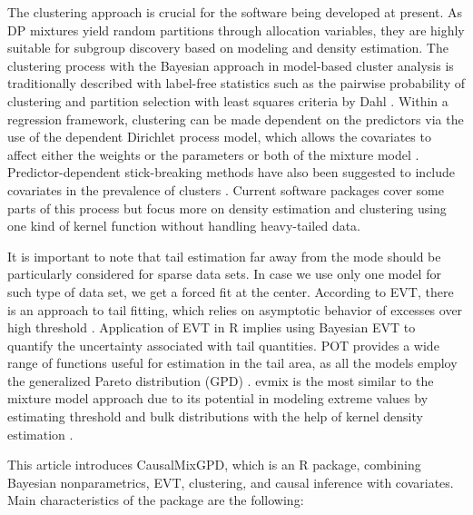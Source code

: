 \documentclass[preprint,12pt,authoryear]{elsarticle}
\newcommand{\pkg}[1]{\textsf{#1}}
\newcommand{\proglang}[1]{\textsf{#1}}
\begin{document}
The clustering approach is crucial for the software being developed at present.
As DP mixtures yield random partitions through allocation variables,
they are highly suitable for subgroup discovery based on modeling
and density estimation. The clustering process with the Bayesian
approach in model-based cluster analysis is traditionally described
with label-free statistics such as the pairwise probability of
clustering \citep{Binder1978} and partition selection with least
squares criteria by Dahl \citep{Dahl2006}. Within a regression
framework, clustering can be made dependent on the predictors via
the use of the dependent Dirichlet process model, which allows the
covariates to affect either the weights or the parameters or both
of the mixture model \citep{MacEachern1999, MacEachern2000, DeIorio2004, Quintana2022}.
Predictor-dependent stick-breaking methods have also been suggested
to include covariates in the prevalence of clusters
\citep{Ren2011}. Current software packages cover some parts of this
process but focus more on density estimation and clustering using
one kind of kernel function without handling heavy-tailed data.

It is important to note that tail estimation far away from the mode should be particularly considered for sparse data sets. In case we use only one model for such type of data set, we get a forced fit at the center. According to EVT, there is an approach to tail fitting, which relies on asymptotic behavior of excesses over high threshold
\citep{BalkemaDeHaan1974,Pickands1975,Coles2001}. Application of EVT in \proglang{R} implies using Bayesian EVT to quantify the uncertainty associated with tail quantities. \pkg{POT} provides a wide range of functions useful for estimation in the tail area, as all the models employ the generalized Pareto distribution (GPD)
\citep{POT_pkg}. \pkg{evmix} is the most similar to the mixture model approach due to its potential in modeling extreme values by estimating threshold and bulk distributions with the help of kernel density estimation \citep{evmix_pkg}.

This article introduces \pkg{CausalMixGPD}, which is an \proglang{R} package,
combining Bayesian nonparametrics, EVT, clustering,
and causal inference with covariates. Main characteristics of the package are the following:
\end{document}
